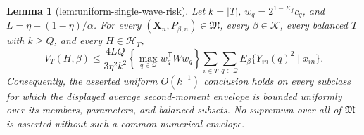\documentclass{article}
\newtheorem{lemma}{Lemma}
\begin{document}
\begin{lemma}[lem:uniform-single-wave-risk]\label{lem:uniform-single-wave-risk}
Let \(k=|T|\), \(w_q=2^{1-K_f}c_q\), and \(L=\eta+(1-\eta)/\alpha\).  For every \((\mathbf X_n,P_{\beta,n})\in\mathfrak M\), every \(\beta\in\mathcal K\), every balanced \(T\) with \(k\geq Q\), and every \(H\in\mathcal H_T\),
\[
 V_T(H,\beta)
 \leq \frac{4LQ}{3\eta^2k^2}
 \left\{\max_{q\in\mathcal Q}w_q^{\mathsf T}Ww_q\right\}
 \sum_{i\in T}\sum_{q\in\mathcal Q}E_\beta\{Y_{in}(q)^2\mid x_{in}\}.
\]
Consequently, the asserted uniform \(O(k^{-1})\) conclusion holds on every subclass for which the displayed average second-moment envelope is bounded uniformly over its members, parameters, and balanced subsets.  No supremum over all of \(\mathfrak M\) is asserted without such a common numerical envelope.
\end{lemma}
\end{document}
